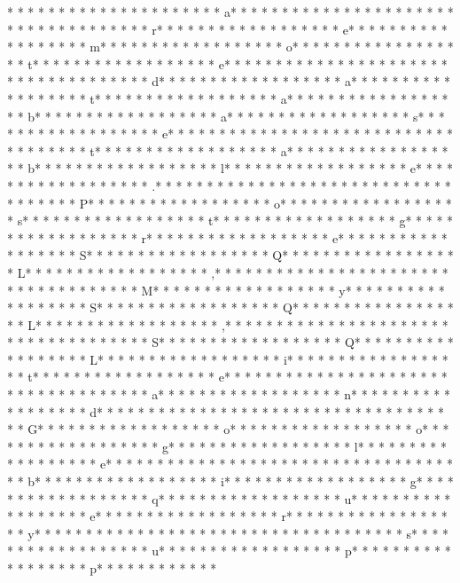 * *  *  * * *  * * *  * * *  *  * * *  *  * * *  * a* * *  * * *  * * *  *  * * *  *  * * *  *  * * *  * * *  * * *  *  * * *  *  * * *  * r* * *  * * *  * * *  *  * * *  *  * * *  * e* * *  * * *  * * *  *  * * *  *  * * *  * m* * *  * * *  * * *  *  * * *  *  * * *  * o* * *  * * *  * * *  *  * * *  *  * * *  * t* * *  * * *  * * *  *  * * *  *  * * *  * e* * *  * * *  * * *  *  * * *  *  * * *  *  * * *  * * *  * * *  *  * * *  *  * * *  * d* * *  * * *  * * *  *  * * *  *  * * *  * a* * *  * * *  * * *  *  * * *  *  * * *  * t* * *  * * *  * * *  *  * * *  *  * * *  * a* * *  * * *  * * *  *  * * *  *  * * *  * b* * *  * * *  * * *  *  * * *  *  * * *  * a* * *  * * *  * * *  *  * * *  *  * * *  * s* * *  * * *  * * *  *  * * *  *  * * *  * e* * *  * * *  * * *  *  * * *  *  * * *  *  * * *  * * *  * * *  *  * * *  *  * * *  * t* * *  * * *  * * *  *  * * *  *  * * *  * a* * *  * * *  * * *  *  * * *  *  * * *  * b* * *  * * *  * * *  *  * * *  *  * * *  * l* * *  * * *  * * *  *  * * *  *  * * *  * e* * *  * * *  * * *  *  * * *  *  * * *  * .* * *  * * *  * * *  *  * * *  *  * * *  *  * * *  * * *  * * *  *  * * *  *  * * *  * P* * *  * * *  * * *  *  * * *  *  * * *  * o* * *  * * *  * * *  *  * * *  *  * * *  * s* * *  * * *  * * *  *  * * *  *  * * *  * t* * *  * * *  * * *  *  * * *  *  * * *  * g* * *  * * *  * * *  *  * * *  *  * * *  * r* * *  * * *  * * *  *  * * *  *  * * *  * e* * *  * * *  * * *  *  * * *  *  * * *  * S* * *  * * *  * * *  *  * * *  *  * * *  * Q* * *  * * *  * * *  *  * * *  *  * * *  * L* * *  * * *  * * *  *  * * *  *  * * *  * ,* * *  * * *  * * *  *  * * *  *  * * *  *  * * *  * * *  * * *  *  * * *  *  * * *  * M* * *  * * *  * * *  *  * * *  *  * * *  * y* * *  * * *  * * *  *  * * *  *  * * *  * S* * *  * * *  * * *  *  * * *  *  * * *  * Q* * *  * * *  * * *  *  * * *  *  * * *  * L* * *  * * *  * * *  *  * * *  *  * * *  * ,* * *  * * *  * * *  *  * * *  *  * * *  *  * * *  * * *  * * *  *  * * *  *  * * *  * S* * *  * * *  * * *  *  * * *  *  * * *  * Q* * *  * * *  * * *  *  * * *  *  * * *  * L* * *  * * *  * * *  *  * * *  *  * * *  * i* * *  * * *  * * *  *  * * *  *  * * *  * t* * *  * * *  * * *  *  * * *  *  * * *  * e* * *  * * *  * * *  *  * * *  *  * * *  *  * * *  * * *  * * *  *  * * *  *  * * *  * a* * *  * * *  * * *  *  * * *  *  * * *  * n* * *  * * *  * * *  *  * * *  *  * * *  * d* * *  * * *  * * *  *  * * *  *  * * *  *  * * *  * * *  * * *  *  * * *  *  * * *  * G* * *  * * *  * * *  *  * * *  *  * * *  * o* * *  * * *  * * *  *  * * *  *  * * *  * o* * *  * * *  * * *  *  * * *  *  * * *  * g* * *  * * *  * * *  *  * * *  *  * * *  * l* * *  * * *  * * *  *  * * *  *  * * *  * e* * *  * * *  * * *  *  * * *  *  * * *  *  * * *  * * *  * * *  *  * * *  *  * * *  * b* * *  * * *  * * *  *  * * *  *  * * *  * i* * *  * * *  * * *  *  * * *  *  * * *  * g* * *  * * *  * * *  *  * * *  *  * * *  * q* * *  * * *  * * *  *  * * *  *  * * *  * u* * *  * * *  * * *  *  * * *  *  * * *  * e* * *  * * *  * * *  *  * * *  *  * * *  * r* * *  * * *  * * *  *  * * *  *  * * *  * y* * *  * * *  * * *  *  * * *  *  * * *  *  * * *  * * *  * * *  *  * * *  *  * * *  * s* * *  * * *  * * *  *  * * *  *  * * *  * u* * *  * * *  * * *  *  * * *  *  * * *  * p* * *  * * *  * * *  *  * * *  *  * * *  * p* * *  * * *  * * *  *  * * 